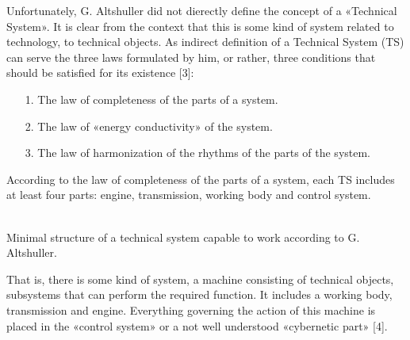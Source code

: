\documentclass[11pt,a4paper]{article}
\newcommand{\bbox}[2]{\parbox{#1cm}{\small\centering #2}}
\begin{document}
Unfortunately, G. Altshuller did not dierectly define the concept of a
«Technical System». It is clear from the context that this is some kind of
system related to technology, to technical objects. As indirect definition of
a Technical System (TS) can serve the three laws formulated by him, or rather,
three conditions that should be satisfied for its existence [3]:
\begin{itemize}[noitemsep]
\item[1.] The law of completeness of the parts of a system.
\item[2.] The law of «energy conductivity» of the system.
\item[3.] The law of harmonization of the rhythms of the parts of the system.
\end{itemize}
According to the law of completeness of the parts of a system, each TS
includes at least four parts: engine, transmission, working body and control
system.  
\begin{center}
\\
Minimal structure of a technical system capable to work according to
G. Altshuller.
\end{center}
That is, there is some kind of system, a machine consisting of technical
objects, subsystems that can perform the required function. It includes a
working body, transmission and engine. Everything governing the action of this
machine is placed in the «control system» or a not well understood «cybernetic
part» [4].
\end{document}
